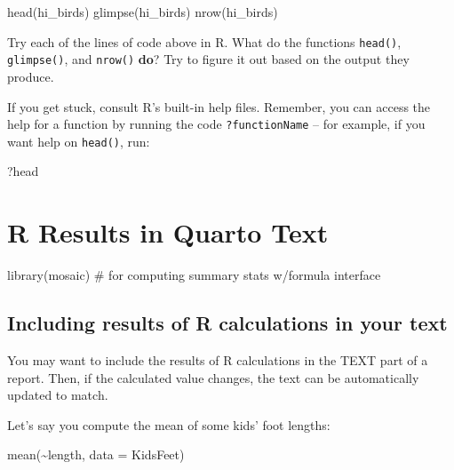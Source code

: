 \documentclass[
  letterpaper,
  DIV=11,
  numbers=noendperiod]{scrreprt}
\newenvironment{Shaded}{\begin{snugshade}}{\end{snugshade}}
\newcommand{\AttributeTok}[1]{\textcolor[rgb]{0.40,0.45,0.13}{#1}}
\newcommand{\CommentTok}[1]{\textcolor[rgb]{0.37,0.37,0.37}{#1}}
\newcommand{\FunctionTok}[1]{\textcolor[rgb]{0.28,0.35,0.67}{#1}}
\newcommand{\NormalTok}[1]{\textcolor[rgb]{0.00,0.23,0.31}{#1}}
\newcommand{\SpecialCharTok}[1]{\textcolor[rgb]{0.37,0.37,0.37}{#1}}
\theoremstyle{remark}
\begin{document}
\begin{Shaded}
\begin{Highlighting}[]
\FunctionTok{head}\NormalTok{(hi\_birds)}
\FunctionTok{glimpse}\NormalTok{(hi\_birds)}
\FunctionTok{nrow}\NormalTok{(hi\_birds)}
\end{Highlighting}
\end{Shaded}

Try each of the lines of code above in R. What do the functions
\texttt{head()}, \texttt{glimpse()}, and \texttt{nrow()} \textbf{do}?
Try to figure it out based on the output they produce.

If you get stuck, consult R's built-in help files. Remember, you can
access the help for a function by running the code
\texttt{?functionName} -- for example, if you want help on
\texttt{head()}, run:

\begin{Shaded}
\begin{Highlighting}[]
\NormalTok{?head}
\end{Highlighting}
\end{Shaded}

\chapter{R Results in Quarto Text}\label{r-results-in-quarto-text}

\begin{Shaded}
\begin{Highlighting}[]
\FunctionTok{library}\NormalTok{(mosaic) }\CommentTok{\# for computing summary stats w/formula interface}
\end{Highlighting}
\end{Shaded}

\section{Including results of R calculations in your
text}\label{including-results-of-r-calculations-in-your-text}

You may want to include the results of R calculations in the TEXT part
of a report. Then, if the calculated value changes, the text can be
automatically updated to match.

Let's say you compute the mean of some kids' foot lengths:

\begin{Shaded}
\begin{Highlighting}[]
\FunctionTok{mean}\NormalTok{(}\SpecialCharTok{\textasciitilde{}}\NormalTok{length, }\AttributeTok{data =}\NormalTok{ KidsFeet)}
\end{Highlighting}
\end{Shaded}
\end{document}

